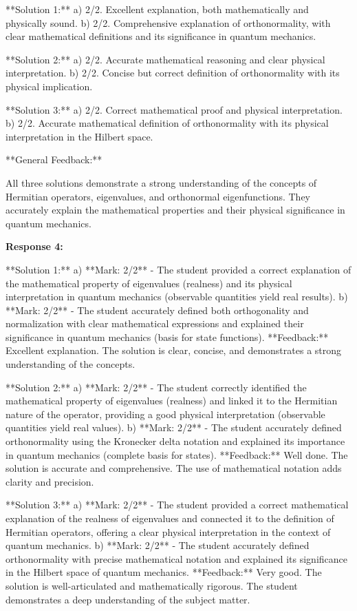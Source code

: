 \documentclass[a4paper,11pt]{article}
\begin{document}
**Solution 1:**
a) 2/2. Excellent explanation, both mathematically and physically sound.
b) 2/2. Comprehensive explanation of orthonormality, with clear mathematical definitions and its significance in quantum mechanics.

**Solution 2:**
a) 2/2. Accurate mathematical reasoning and clear physical interpretation.
b) 2/2. Concise but correct definition of orthonormality with its physical implication.

**Solution 3:**
a) 2/2. Correct mathematical proof and physical interpretation.
b) 2/2. Accurate mathematical definition of orthonormality with its physical interpretation in the Hilbert space.

**General Feedback:**

All three solutions demonstrate a strong understanding of the concepts of Hermitian operators, eigenvalues, and orthonormal eigenfunctions. They accurately explain the mathematical properties and their physical significance in quantum mechanics. 

\bigskip    
\textbf{Response 4:}

**Solution 1:**
a) **Mark: 2/2** - The student provided a correct explanation of the mathematical property of eigenvalues (realness) and its physical interpretation in quantum mechanics (observable quantities yield real results).
b) **Mark: 2/2** - The student accurately defined both orthogonality and normalization with clear mathematical expressions and explained their significance in quantum mechanics (basis for state functions).
**Feedback:** Excellent explanation. The solution is clear, concise, and demonstrates a strong understanding of the concepts.

**Solution 2:**
a) **Mark: 2/2** - The student correctly identified the mathematical property of eigenvalues (realness) and linked it to the Hermitian nature of the operator, providing a good physical interpretation (observable quantities yield real values).
b) **Mark: 2/2** - The student accurately defined orthonormality using the Kronecker delta notation and explained its importance in quantum mechanics (complete basis for states).
**Feedback:** Well done. The solution is accurate and comprehensive. The use of mathematical notation adds clarity and precision.

**Solution 3:**
a) **Mark: 2/2** - The student provided a correct mathematical explanation of the realness of eigenvalues and connected it to the definition of Hermitian operators, offering a clear physical interpretation in the context of quantum mechanics.
b) **Mark: 2/2** - The student accurately defined orthonormality with precise mathematical notation and explained its significance in the Hilbert space of quantum mechanics.
**Feedback:** Very good. The solution is well-articulated and mathematically rigorous. The student demonstrates a deep understanding of the subject matter.
\end{document}
